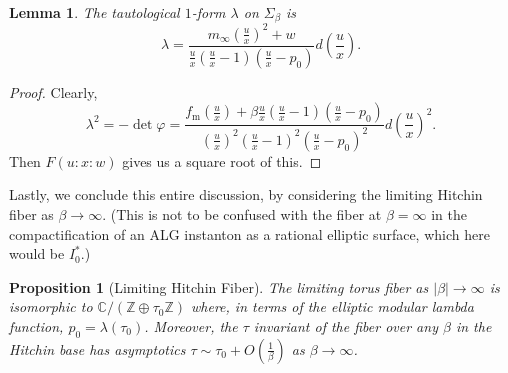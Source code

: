 \documentclass[12pt,letterpaper,reqno]{amsart}
\newtheorem{lem}[thm]{Lemma}
\newtheorem{prop}[thm]{Proposition}
\theoremstyle{remark}
\theoremstyle{definition}
\numberwithin{thm}{section}
\numberwithin{equation}{section}
\numberwithin{figure}{section}
\newcommand{\C}{\ensuremath{\mathbb C}}
\newcommand{\Z}{\ensuremath{\mathbb Z}}
\begin{document}
 \begin{lem}\label{lem:tautological}
 The tautological $1$-form $\lambda$ on $\Sigma_\beta$ is 
\begin{equation}
\lambda =   \frac{m_\infty (\frac{u}{x})^2 + w}{\frac{u}{x}(\frac{u}{x}-1)(\frac{u}{x}-p_0)} d\left(\frac{u}{x}\right).
\end{equation}
 \end{lem}
\begin{proof}
Clearly, \begin{equation}\lambda^2 = -\det \varphi = \frac{f_{\mathrm{m}}(\frac{u}{x})+ \beta \frac{u}{x}(\frac{u}{x}-1)(\frac{u}{x}-p_0)}{(\frac{u}{x})^2 (\frac{u}{x}-1)^2(\frac{u}{x}-p_0)^2} d\left(\frac{u}{x}\right)^2.\end{equation}
Then $F(u:x:w)$ gives us a square root of this.
\end{proof}

Lastly, we conclude this entire discussion, by considering the limiting Hitchin fiber as $\beta \to \infty$. (This is not to be confused with the fiber at $\beta=\infty$ in the compactification of an ALG instanton as a rational elliptic surface, which here would be $I_0^*$.)


\begin{prop}[Limiting Hitchin Fiber]\label{prop:jinv}
The limiting torus fiber as $|\beta| \to \infty$ is isomorphic to $\C/(\Z \oplus \tau_0 \Z)$ where, 
in terms of the elliptic modular lambda function, $p_0=\lambda(\tau_0)$. 
Moreover,  the $\tau$ invariant of the fiber over any $\beta$ in the Hitchin base has asymptotics $\tau \sim \tau_0 + O(\frac{1}{\beta})$ 
as $\beta \to \infty$.
\end{prop}
\end{document}
